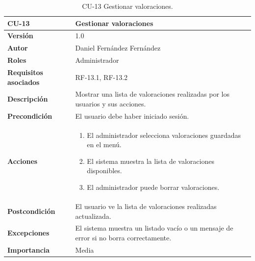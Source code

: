 \begin{table}[p]
\centering
        \begin{tabularx}{\linewidth}{ p{} p{} }
            \toprule
            \textbf{CU-13} & \textbf{Gestionar valoraciones}\\
            \toprule
            \textbf{Versión} & 1.0 \\
            \textbf{Autor} & Daniel Fernández Fernández \\
            \textbf{Roles} & Administrador \\
            \textbf{Requisitos asociados} & RF-13.1, RF-13.2 \\
            \textbf{Descripción} & Mostrar una lista de valoraciones realizadas por los usuarios y sus acciones. \\
            \textbf{Precondición} & El usuario debe haber iniciado sesión. \\
            \textbf{Acciones} &
            \begin{enumerate}
            \def\labelenumi{\arabic{enumi}.}
            \tightlist
            \item El administrador selecciona valoraciones guardadas en el menú.
            \item El sistema muestra la lista de valoraciones disponibles.
            \item El administrador puede borrar valoraciones.
            \end{enumerate}\\
            \textbf{Postcondición} & El usuario ve la lista de valoraciones realizadas actualizada. \\
            \textbf{Excepciones} & El sistema muestra un listado vacío o un mensaje de error si no borra correctamente. \\
            \textbf{Importancia} & Media \\
            \bottomrule
        \end{tabularx}
        \caption{CU-13 Gestionar valoraciones.}
\end{table}


